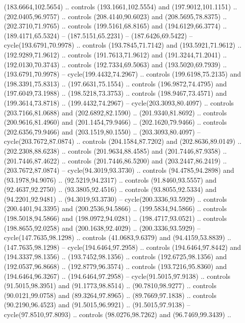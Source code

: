 \begin{scope}[cm={{1.25,0.0,0.0,-1.25,(0.0,442.91375)}}]
    (183.6664,102.5654) .. controls (193.1661,102.5554) and (197.9012,101.1151) ..
    (202.0405,96.9757) .. controls (208.4140,90.6023) and (208.5695,78.8375) ..
    (202.3710,71.9765) .. controls (199.5161,68.8165) and (194.6129,66.3774) ..
    (189.4171,65.5324) -- (187.5151,65.2231) -- (187.6426,69.5422) --
    cycle(193.6791,70.9978) .. controls (193.7845,71.7142) and (193.5921,71.9612)
    .. (192.9289,71.9612) .. controls (191.7613,71.9612) and (191.3244,71.2041) ..
    (192.0130,70.3743) .. controls (192.7334,69.5063) and (193.5020,69.7939) ..
    (193.6791,70.9978) -- cycle(199.4432,74.2967) .. controls (199.6198,75.2135)
    and (198.3391,75.8313) .. (197.6631,75.1554) .. controls (196.9872,74.4795)
    and (197.6049,73.1988) .. (198.5218,73.3753) .. controls (198.9467,73.4571)
    and (199.3614,73.8718) .. (199.4432,74.2967) -- cycle(203.3093,80.4097) ..
    controls (203.7166,81.0688) and (202.6892,82.1590) .. (201.9340,81.8692) ..
    controls (200.9616,81.4960) and (201.1454,79.9466) .. (202.1620,79.9466) ..
    controls (202.6356,79.9466) and (203.1519,80.1550) .. (203.3093,80.4097) --
    cycle(203.7672,87.0874) .. controls (204.1584,87.7202) and (202.8636,89.0149)
    .. (202.2308,88.6238) .. controls (201.9634,88.4585) and (201.7446,87.9358) ..
    (201.7446,87.4622) .. controls (201.7446,86.5200) and (203.2447,86.2419) ..
    (203.7672,87.0874) -- cycle(94.3019,93.3730) .. controls (94.4785,94.2898) and
    (93.1978,94.9076) .. (92.5219,94.2317) .. controls (91.8460,93.5557) and
    (92.4637,92.2750) .. (93.3805,92.4516) .. controls (93.8055,92.5334) and
    (94.2201,92.9481) .. (94.3019,93.3730) -- cycle(200.3336,93.5929) .. controls
    (200.4401,94.3395) and (200.2536,94.5866) .. (199.5834,94.5866) .. controls
    (198.5018,94.5866) and (198.0972,94.0281) .. (198.4717,93.0521) .. controls
    (198.8655,92.0258) and (200.1638,92.4029) .. (200.3336,93.5929) --
    cycle(147.7635,98.1298) .. controls (41.0683,9.6379) and (94.4159,53.8839) ..
    (147.7635,98.1298) -- cycle(194.6464,97.2958) .. controls (194.6464,97.8442)
    and (194.3337,98.1356) .. (193.7452,98.1356) .. controls (192.6725,98.1356)
    and (192.0537,96.8668) .. (192.8779,96.3574) .. controls (193.7216,95.8360)
    and (194.6464,96.3267) .. (194.6464,97.2958) -- cycle(91.5015,97.9138) ..
    controls (91.5015,98.3951) and (91.1773,98.8514) .. (90.7810,98.9277) ..
    controls (90.0121,99.0758) and (89.3264,97.8965) .. (89.7669,97.1838) ..
    controls (90.2190,96.4523) and (91.5015,96.9921) .. (91.5015,97.9138) --
    cycle(97.8510,97.8093) .. controls (98.0276,98.7262) and (96.7469,99.3439) ..

\end{scope}
